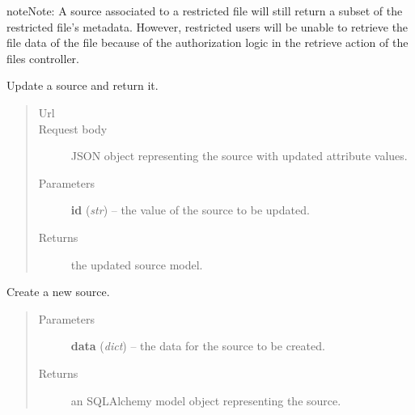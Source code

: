 \documentclass[letterpaper,10pt,english]{sphinxmanual}
\begin{document}
\begin{fulllineitems}
\begin{fulllineitems}
\begin{notice}{note}{Note:}
A source associated to a restricted file will still return a subset
of the restricted file's metadata.  However, restricted users will
be unable to retrieve the file data of the file because of the
authorization logic in the retrieve action of the files controller.
\end{notice}

\end{fulllineitems}


\begin{fulllineitems}
\label{api:onlinelinguisticdatabase.controllers.sources.SourcesController.update}
Update a source and return it.
\begin{quote}\begin{description}
\item[{Url }] \leavevmode
{}

\item[{Request body}] \leavevmode
JSON object representing the source with updated attribute values.

\item[{Parameters}] \leavevmode
\textbf{id} (\emph{str}) -- the  value of the source to be updated.

\item[{Returns}] \leavevmode
the updated source model.

\end{description}\end{quote}

\end{fulllineitems}


\end{fulllineitems}


\begin{fulllineitems}
\label{api:onlinelinguisticdatabase.controllers.sources.createNewSource}
Create a new source.
\begin{quote}\begin{description}
\item[{Parameters}] \leavevmode
\textbf{data} (\emph{dict}) -- the data for the source to be created.

\item[{Returns}] \leavevmode
an SQLAlchemy model object representing the source.

\end{description}\end{quote}

\end{fulllineitems}
\end{document}
